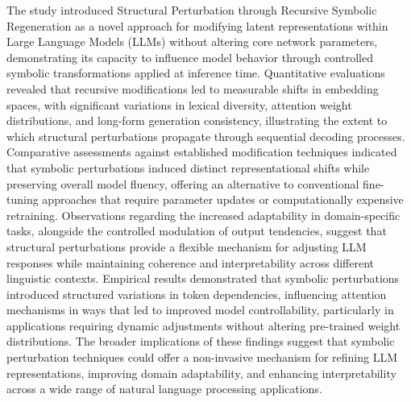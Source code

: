\documentclass[5p,times]{elsarticle}
\begin{document}
The study introduced Structural Perturbation through Recursive Symbolic Regeneration as a novel approach for modifying latent representations within Large Language Models (LLMs) without altering core network parameters, demonstrating its capacity to influence model behavior through controlled symbolic transformations applied at inference time. Quantitative evaluations revealed that recursive modifications led to measurable shifts in embedding spaces, with significant variations in lexical diversity, attention weight distributions, and long-form generation consistency, illustrating the extent to which structural perturbations propagate through sequential decoding processes. Comparative assessments against established modification techniques indicated that symbolic perturbations induced distinct representational shifts while preserving overall model fluency, offering an alternative to conventional fine-tuning approaches that require parameter updates or computationally expensive retraining. Observations regarding the increased adaptability in domain-specific tasks, alongside the controlled modulation of output tendencies, suggest that structural perturbations provide a flexible mechanism for adjusting LLM responses while maintaining coherence and interpretability across different linguistic contexts. Empirical results demonstrated that symbolic perturbations introduced structured variations in token dependencies, influencing attention mechanisms in ways that led to improved model controllability, particularly in applications requiring dynamic adjustments without altering pre-trained weight distributions. The broader implications of these findings suggest that symbolic perturbation techniques could offer a non-invasive mechanism for refining LLM representations, improving domain adaptability, and enhancing interpretability across a wide range of natural language processing applications.



\end{document}
